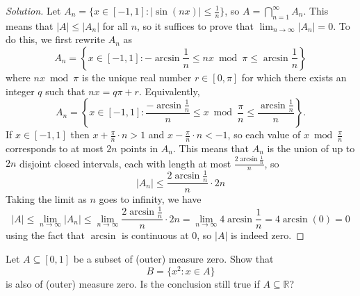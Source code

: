 \documentclass[11pt]{article}
\providecommand{\RR}{\mathbb R}
\newenvironment{soln}{\begin{proof}[Solution]}{\end{proof}}
\providecommand{\abs}[1]{\left|#1\right|}
\begin{document}
\begin{soln}
    Let $A_n = \{ x\in[-1,1] : |\sin(nx)| \le \frac 1n\}$, so
    $A = \bigcap_{n=1}^\infty A_n$. This means that $|A| \le |A_n|$
    for all $n$, so it suffices to prove that $\lim_{n\to\infty} |A_n| = 0$.
    To do this, we first rewrite $A_n$ as
    \begin{equation*}
	A_n = \left\{ x\in[-1,1] :
	-\arcsin\frac1n \le nx\bmod\pi \le\arcsin\frac 1n \right\}
    \end{equation*}
    where $nx\bmod\pi$ is the unique real number $r\in[0,\pi]$
    for which there exists an integer $q$ such that $nx = q\pi + r$.
    Equivalently,
    \begin{equation*}
	A_n = \left\{ x\in[-1,1] :
	\frac{-\arcsin\frac1n}n \le x\bmod\frac\pi n \le\frac{\arcsin\frac 1n}n
	\right\}.
    \end{equation*}
    If $x\in[-1,1]$ then $x + \frac\pi n\cdot n > 1$
    and $x - \frac\pi n\cdot n < -1$, so
    each value of $x\bmod\frac\pi n$ corresponds to
    at most $2n$ points in $A_n$. This means that $A_n$ is
    the union of up to $2n$ disjoint closed intervals,
    each with length at most $\frac{2\arcsin\frac 1n}n$, so
    \begin{equation*}
	|A_n|\le \frac{2\arcsin\frac 1n}n \cdot 2n
    \end{equation*}
    Taking the limit as $n$ goes to infinity, we have
    \begin{equation*}
	\abs A \le \lim_{n\to\infty} |A_n| \le
	\lim_{n\to\infty} \frac{2\arcsin\frac 1n}{n} \cdot 2n =
	\lim_{n\to\infty} 4\arcsin\frac 1n =
	4\arcsin(0) = 0
    \end{equation*}
    using the fact that $\arcsin$ is continuous at $0$,
    so $\abs A$ is indeed zero.
\end{soln}

\pagebreak

\begin{problem}
    Let $A\subseteq[0,1]$ be a subset of (outer) measure zero. Show that
    \begin{equation*}
	B = \{ x^2 : x\in A\}
    \end{equation*}
    is also of (outer) measure zero. Is the conclusion still true if $A\subseteq\RR$?
\end{problem}
\end{document}
